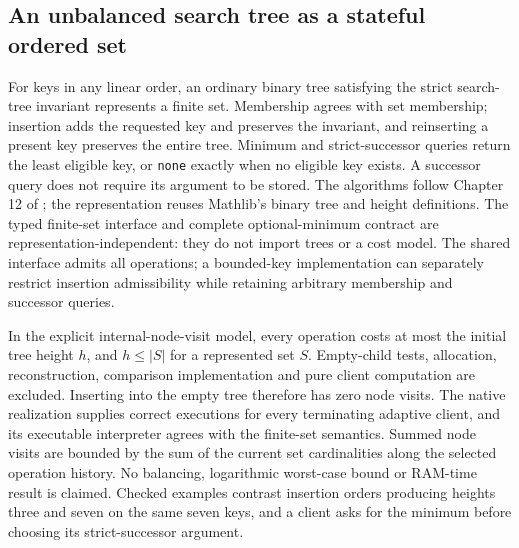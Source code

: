 \begin{result}
\subsection{An unbalanced search tree as a stateful ordered set}
For keys in any linear order, an ordinary binary tree satisfying the strict search-tree
invariant represents a finite set. Membership agrees with set membership; insertion adds the
requested key and preserves the invariant, and reinserting a present key preserves the entire
tree. Minimum and strict-successor queries return the least eligible key, or \texttt{none} exactly
when no eligible key exists. A successor query does not require its argument to be stored.
The algorithms follow Chapter 12 of \citet{CLRS2009}; the representation reuses Mathlib's binary
tree and height definitions. The typed finite-set interface and complete optional-minimum
contract are representation-independent: they do not import trees or a cost model. The shared
interface admits all operations; a bounded-key implementation can separately restrict insertion
admissibility while retaining arbitrary membership and successor queries.

In the explicit internal-node-visit model, every operation costs at most the initial tree height
$h$, and $h\le |S|$ for a represented set $S$. Empty-child tests, allocation, reconstruction,
comparison implementation and pure client computation are excluded. Inserting into the empty
tree therefore has zero node visits. The native realization supplies correct executions for
every terminating adaptive client, and its executable interpreter agrees with the finite-set
semantics. Summed node visits are bounded by the sum of the current set cardinalities along the
selected operation history. No balancing, logarithmic worst-case bound or RAM-time result is
claimed. Checked examples contrast insertion orders producing heights three and seven on the
same seven keys, and a client asks for the minimum before choosing its strict-successor argument.
\end{result}

